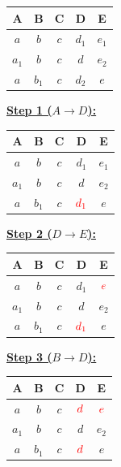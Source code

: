 \documentclass[12pt]{article}
\begin{document}
\begin{enumerate}[1.]
\begin{enumerate}[a)]
        \begin{tabular}{|c|c|c|c|c|}
            \hline
            A & B & C & D & E\\
            \hline
            $a$ & $b$ & $c$ & $d_1$ & $e_1$\\
            \hline
            $a_1$ & $b$ & $c$ & $d$ & $e_2$\\
            \hline
            $a$ & $b_1$ & $c$ & $d_2$ & $e$\\
            \hline
        \end{tabular}

        \underline{\textbf{Step 1 ($A \to D$):}}

        \bigskip

        \begin{tabular}{|c|c|c|c|c|}
            \hline
            A & B & C & D & E\\
            \hline
            $a$ & $b$ & $c$ & $d_1$ & $e_1$\\
            \hline
            $a_1$ & $b$ & $c$ & $d$ & $e_2$\\
            \hline
            $a$ & $b_1$ & $c$ & $\color{red}d_1$ & $e$\\
            \hline
        \end{tabular}

        \underline{\textbf{Step 2 ($D \to E$):}}

        \bigskip

        \begin{tabular}{|c|c|c|c|c|}
            \hline
            A & B & C & D & E\\
            \hline
            $a$ & $b$ & $c$ & $d_1$ & $\color{red}e$\\
            \hline
            $a_1$ & $b$ & $c$ & $d$ & $e_2$\\
            \hline
            $a$ & $b_1$ & $c$ & $\color{red}d_1$ & $e$\\
            \hline
        \end{tabular}

        \bigskip

        \underline{\textbf{Step 3 ($B \to D$):}}

        \bigskip

        \begin{tabular}{|c|c|c|c|c|}
            \hline
            A & B & C & D & E\\
            \hline
            $a$ & $b$ & $c$ & $\color{red}d$ & $\color{red}e$\\
            \hline
            $a_1$ & $b$ & $c$ & $d$ & $e_2$\\
            \hline
            $a$ & $b_1$ & $c$ & $\color{red}d$ & $e$\\
            \hline
        \end{tabular}


\end{enumerate}
\end{enumerate}
\end{document}
